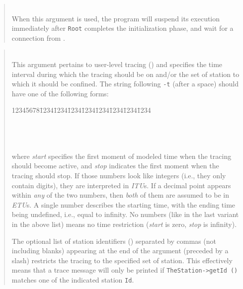 \begin{quote}
\noindent{}\\ \hspace{0in}
When this argument is used, the program will suspend its execution
immediately after {\tt Root} completes the initialization phase,
and wait for a connection from \dsd.
\end{quote}

\begin{quote}
\noindent{}\\ \hspace{0in}
This argument pertains to user-level tracing () and
specifies the time interval during which the tracing should be on and/or
the set of station to which it should be confined.
The string following {\tt -t} (after a space) should have one of the following
forms:

{\tt\begin{tabbing}
12345678\=1234\=1234\=1234\=1234\=1234\=1234\=1234\=1234\kill
{} \\
 \\
 \\
 \\
\end{tabbing}}
\noindent
where {\em start\/} specifies the first moment of modeled time when the tracing
should become active, and {\em stop\/} indicates
the first moment when the tracing should stop.
If those numbers look like integers (i.e., they only contain digits), they are
interpreted in {\em ITU\/}s.
If a decimal point appears within {\em any\/}
of the two numbers, then {\em both\/} of them
are assumed to be in {\em ETU\/}s.
A single number describes the starting time, with the ending time being
undefined, i.e., equal to infinity.
No numbers (like in the last variant in the above list) means no time
restriction ({\em start\/} is zero, {\em stop\/} is infinity).

The optional list of station identifiers () separated
by commas (not including blanks) appearing at the end of
the argument (preceded by a slash) restricts the tracing to the specified set
of station.
This effectively means that a trace message will only be printed if
{\tt TheStation->getId}~{\tt ()} matches one of the indicated station
{\tt Id}.


\end{quote}
